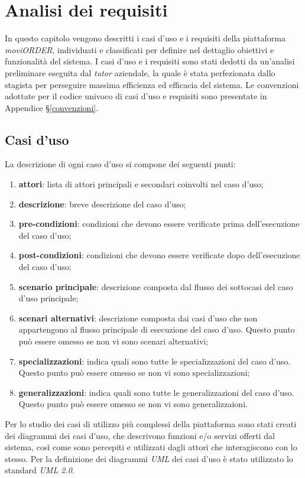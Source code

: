 
\chapter{Analisi dei requisiti}
\label{cap:analisi-requisiti}

In questo capitolo vengono descritti i casi d'uso e i requisiti della piattaforma \textit{moviORDER}, individuati e classificati per definire nel dettaglio obiettivi e funzionalità del sistema. I casi d'uso e i requisiti sono stati dedotti da un'analisi preliminare eseguita dal \textit{tutor} aziendale, la quale è stata perfezionata dallo stagista per perseguire massima efficienza ed efficacia del sistema. Le convenzioni adottate per il codice univoco di casi d'uso e requisiti sono presentate in Appendice §\ref{convenzioni}.

\section{Casi d'uso}

La descrizione di ogni caso d'uso si compone dei seguenti punti:
\begin{enumerate}
	\item \textbf{attori}: lista di attori principali e secondari coinvolti nel caso d'uso;
    \item \textbf{descrizione}: breve descrizione del caso d'uso;
    \item \textbf{pre-condizioni}: condizioni che devono essere verificate prima dell'esecuzione del caso d'uso;
    \item \textbf{post-condizioni}: condizioni che devono essere verificate dopo dell'esecuzione del caso d'uso;
    \item \textbf{scenario principale}: descrizione composta dal flusso dei sottocasi del caso d'uso principale;
    \item \textbf{scenari alternativi}: descrizione composta dai casi d'uso che non appartengono al flusso
    principale di esecuzione del caso d'uso. Questo punto può essere omesso se non vi sono scenari alternativi;
    \item \textbf{specializzazioni}: indica quali sono tutte le specializzazioni del caso d'uso. Questo punto può essere omesso se non vi sono specializzazioni;
    \item \textbf{generalizzazioni}: indica quali sono tutte le generalizzazioni del caso d'uso. Questo punto può essere omesso se non vi sono generalizzaioni.
\end{enumerate}
Per lo studio dei casi di utilizzo più complessi della piattaforma sono stati creati dei diagrammi dei casi d'uso, che descrivono funzioni e/o servizi offerti dal sistema, così come sono percepiti e utilizzati dagli attori che interagiscono con lo stesso. Per la definizione dei diagrammi \textit{UML} dei casi d'uso è stato utilizzato lo standard \textit{UML 2.0}. 

